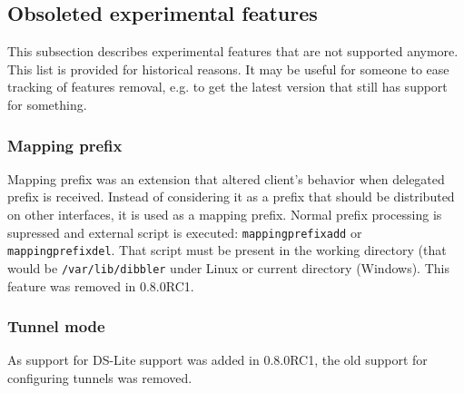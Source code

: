 \subsection{Obsoleted experimental features}
This subsection describes experimental features that are not supported
anymore. This list is provided for historical reasons. It may be
useful for someone to ease tracking of features removal, e.g. to
get the latest version that still has support for something.

\subsubsection{Mapping prefix}
Mapping prefix was an extension that altered client's behavior when
delegated prefix is received. Instead of considering it as a prefix
that should be distributed on other interfaces, it is used as a mapping
prefix. Normal prefix processing is supressed and external script is
executed: \verb+mappingprefixadd+ or \verb+mappingprefixdel+. That
script must be present in the working directory (that would be
\verb+/var/lib/dibbler+ under Linux or current directory (Windows).
This feature was removed in 0.8.0RC1.

\subsubsection{Tunnel mode}
As support for DS-Lite \cite{rfc6334} support was added in
0.8.0RC1, the old support for configuring tunnels was removed.
